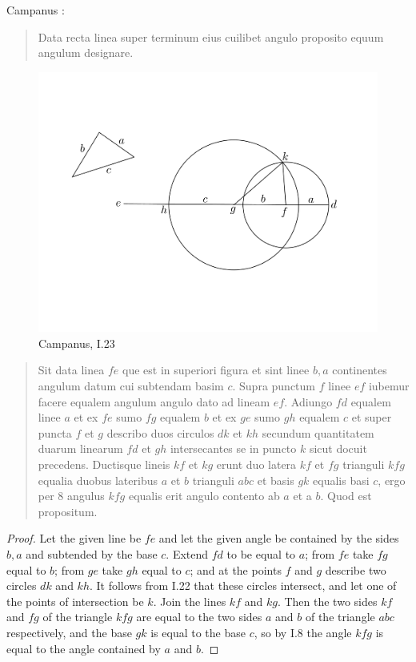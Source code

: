\documentclass{article}
\begin{document}
Campanus \cite[p.~74]{campanusI}:

\begin{quote}
Data recta linea super terminum eius cuilibet angulo proposito
equum angulum designare.
\end{quote}

\begin{figure}
\begin{center}
\includegraphics[width=\textwidth]{campanusI23.png}
\end{center}
\caption{Campanus, I.23}
\label{campanusI23}
\end{figure}

\begin{quote}
Sit data linea $fe$ que est in superiori figura et sint linee $b,a$ continentes
angulum datum cui subtendam basim $c$. Supra punctum $f$ linee $ef$
iubemur facere equalem angulum angulo dato ad lineam $ef$. Adiungo $fd$
equalem linee $a$ et ex $fe$ sumo $fg$ equalem $b$ et ex $ge$ sumo $gh$ equalem $c$
et super puncta $f$ et $g$ describo duos circulos $dk$ et $kh$ secundum quantitatem
duarum linearum $fd$ et $gh$ intersecantes se in puncto $k$ sicut docuit
precedens. 
Ductisque lineis $kf$ et $kg$ erunt duo latera $kf$ et $fg$ trianguli
$kfg$ equalia duobus lateribus $a$ et $b$ trianguli $abc$ et basis $gk$ equalis basi
$c$, ergo per 8 angulus $kfg$ equalis erit angulo contento ab $a$ et a $b$. Quod
est propositum.
\end{quote}

\begin{proof}
Let the given line be $fe$ and let the given angle be contained by the sides $b,a$ and subtended by the base
$c$. Extend $fd$ to be equal to $a$; from $fe$ take $fg$ equal to $b$;
 from $ge$ take $gh$ equal to $c$; and at the points $f$ and $g$ describe two circles 
 $dk$ and $kh$. 
It follows from I.22 that 
these circles intersect, and let one of the points of intersection be $k$. 
 Join the lines $kf$ and $kg$. 
 Then the two sides $kf$ and $fg$ of the triangle
 $kfg$ are
 equal to the two sides $a$ and $b$ of the triangle $abc$ respectively,
 and the base $gk$ is equal to the base $c$, so by I.8 the angle $kfg$ is equal to the angle contained
 by $a$ and $b$.  
\end{proof}
\end{document}
